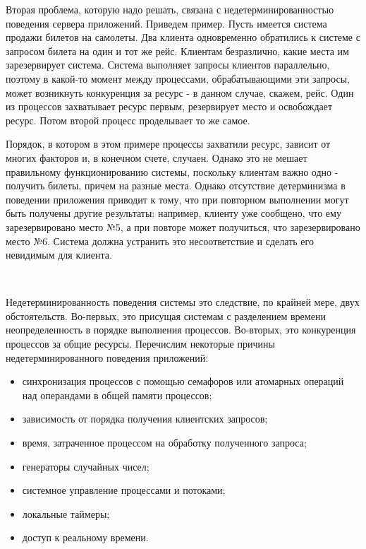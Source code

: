 \begin{multicols}{2}
Вторая проблема, которую надо решать, связана с недетерминированностью поведения сервера приложений. Приведем пример.  Пусть имеется система продажи билетов на самолеты. Два клиента одновременно обратились к системе с запросом билета на один и тот же рейс. Клиентам безразлично, какие места им зарезервирует система. Система выполняет запросы клиентов параллельно, поэтому в какой-то момент между процессами, обрабатывающими эти запросы, может возникнуть конкуренция за ресурс - в данном случае, скажем, рейс. Один из процессов захватывает ресурс первым, резервирует место и освобождает ресурс. Потом второй процесс проделывает то же самое.

Порядок, в котором в этом примере процессы захватили ресурс, зависит от многих факторов и, в конечном счете, случаен. Однако  это не мешает правильному функционированию системы, поскольку клиентам важно одно - получить билеты, причем на разные места. Однако отсутствие детерминизма в поведении приложения приводит к тому, что при повторном выполнении могут быть получены другие результаты: например, клиенту уже сообщено, что ему зарезервировано место №5, а при повторе может получиться, что зарезервировано место №6. Система должна устранить это несоответствие и сделать его невидимым для клиента.
\begin{figure*} %
\vspace*{1pt}
\begin{center}
\mbox{%
\epsfxsize=1.6in
\epsfxsize=100mm
}
\end{center}
\vspace*{-9pt}
\vspace*{-3pt}
\end{figure*}

Недетерминированность поведения системы это следствие, по крайней мере, двух обстоятельств. Во-первых, это присущая системам с разделением времени неопределенность в порядке выполнения процессов. Во-вторых, это конкуренция процессов за общие ресурсы. Перечислим некоторые причины недетерминированного поведения приложений:
\begin{itemize}
\item синхронизация процессов с помощью семафоров или атомарных операций над операндами в общей памяти процессов;
\item зависимость от порядка получения клиентских запросов;
\item время, затраченное процессом на обработку полученного запроса;
\item генераторы случайных чисел;
\item системное управление процессами и потоками;
\item локальные таймеры;
\item доступ к реальному времени.
\end{itemize}


\end{multicols}
